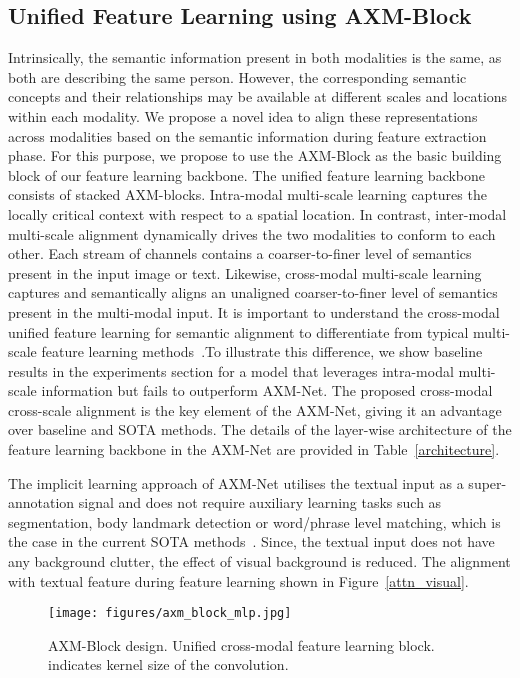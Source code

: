 \documentclass[letterpaper]{article} \usepackage{aaai22}  \usepackage{times}  \usepackage{helvet}  \usepackage{courier}  \usepackage[hyphens]{url}  \usepackage{graphicx} \urlstyle{rm} \def\UrlFont{\rm}  \usepackage{natbib}  \usepackage{caption} \DeclareCaptionStyle{ruled}{labelfont=normalfont,labelsep=colon,strut=off} \frenchspacing  \setlength{\pdfpagewidth}{8.5in}  \setlength{\pdfpageheight}{11in}  \usepackage{algorithm}
\begin{document}
\subsection{Unified Feature Learning using AXM-Block}
Intrinsically, the semantic information present in both modalities is the same, as both are describing the same person. However, the corresponding semantic concepts and their relationships may be available at different scales and locations within each modality. We propose a novel idea to align these representations across modalities based on the semantic information during feature extraction phase. For this purpose, we propose to use the AXM-Block as the basic building block of our feature learning backbone. The unified feature learning backbone consists of stacked AXM-blocks. Intra-modal multi-scale learning captures the locally critical context with respect to a spatial location. In contrast, inter-modal multi-scale alignment dynamically drives the two modalities to conform to each other. Each stream of channels contains a coarser-to-finer level of semantics present in the input image or text. Likewise, cross-modal multi-scale learning captures and semantically aligns an unaligned coarser-to-finer level of semantics present in the multi-modal input. It is important to understand the cross-modal unified feature learning for semantic alignment to differentiate from typical multi-scale feature learning methods~\cite{zhou2019omni,chen2017person,cai2019multi}.To illustrate this difference, we show baseline results in the experiments section for a model that leverages intra-modal multi-scale information but fails to outperform AXM-Net. The proposed cross-modal cross-scale alignment is the key element of the AXM-Net, giving it an advantage over baseline and SOTA methods. The details of the layer-wise architecture of the feature learning backbone in the AXM-Net are provided in Table~\ref{architecture}.

The implicit learning approach of AXM-Net utilises the textual input as a super-annotation signal and does not require auxiliary learning tasks such as segmentation, body landmark detection or word/phrase level matching, which is the case in the current SOTA methods~\cite{aggarwal2020text,wang2020vitaa, gumbel2020}. Since, the textual input does not have any background clutter, the effect of visual background is reduced. The alignment with textual feature during feature learning shown in Figure~\ref{attn_visual}.

\begin{figure}
\centering
        \texttt{[image: figures/axm\_block\_mlp.jpg]}
        \footnotesize{\caption{AXM-Block design. Unified cross-modal feature learning block.  indicates kernel size of the convolution.}
        \label{axm_block}}
\end{figure}
\end{document}

